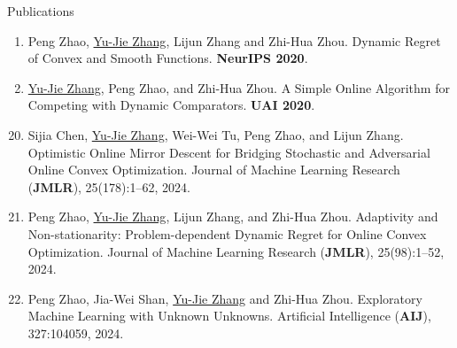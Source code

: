 \documentclass{resume} %
\begin{document}
\begin{rSection}{Publications}
\begin{enumerate}[leftmargin=0.2in, itemsep=-3pt]
	\item Peng Zhao, \underline{Yu-Jie Zhang}, Lijun Zhang and Zhi-Hua Zhou. Dynamic Regret of Convex and Smooth Functions. \textbf{NeurIPS 2020}.
	
	\item \underline{Yu-Jie Zhang}, Peng Zhao, and Zhi-Hua Zhou. A Simple Online Algorithm for Competing with Dynamic Comparators. \textbf{UAI 2020}.
\end{enumerate}
\newpage
{}
\begin{enumerate}[leftmargin=0.2in]
	\setcounter{enumi}{19}
		\item Sijia Chen, \underline{Yu-Jie Zhang}, Wei-Wei Tu, Peng Zhao, and Lijun Zhang. Optimistic Online Mirror Descent for Bridging Stochastic and Adversarial Online Convex Optimization. Journal of Machine Learning Research (\textbf{JMLR}), 25(178):1--62, 2024.
		\item Peng Zhao, \underline{Yu-Jie Zhang}, Lijun Zhang, and Zhi-Hua Zhou. Adaptivity and Non-stationarity: Problem-dependent Dynamic Regret for Online Convex Optimization. Journal of Machine Learning Research (\textbf{JMLR}), 25(98):1--52, 2024.
	\item Peng Zhao, Jia-Wei Shan, \underline{Yu-Jie Zhang} and Zhi-Hua Zhou. Exploratory Machine Learning with Unknown Unknowns. Artificial Intelligence (\textbf{AIJ}), 327:104059, 2024.
\end{enumerate}
\end{rSection}




\end{document}
